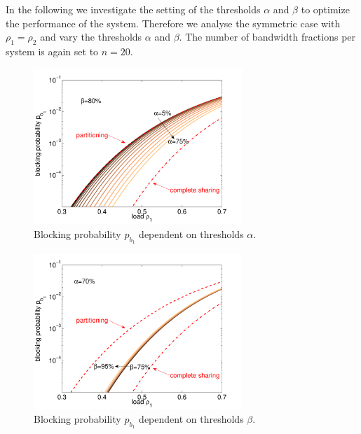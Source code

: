 In the following we investigate the setting of the thresholds $\alpha$ and $\beta$ to optimize the performance of the system.
Therefore we analyse the symmetric case with $\rho_1=\rho_2$ and vary the thresholds $\alpha$ and $\beta$. The number of bandwidth fractions per system is again set to $n=20$.

\begin{figure}[tb]
	\centering
	\includegraphics[width=0.7\textwidth]{aggregation/performance_model/figures/m2_n20_alpha_equal}
 	\caption{Blocking probability $p_{b_1}$ dependent on thresholds $\alpha$.}
 	\label{fig:m2_n20_alpha}
\end{figure}

\begin{figure}[tb]
	\centering
	\includegraphics[width=0.7\textwidth]{aggregation/performance_model/figures/m2_n20_beta_equal}
 	\caption{Blocking probability $p_{b_1}$ dependent on thresholds $\beta$.}
 	\label{fig:m2_n20_beta}
\end{figure}

